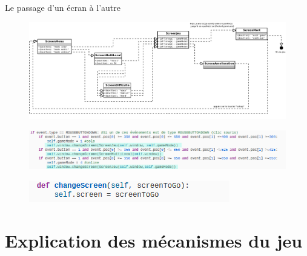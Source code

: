 \documentclass{beamer}
\begin{document}
    
    \begin{frame}{Le passage d'un écran à l'autre}
        \begin{figure}
            \centering
             \includegraphics[scale=0.15]{images/diagrammeEvenementiel.png}
        \end{figure}
        
        \begin{figure}
            \centering
             \includegraphics[scale=0.45]{images/changementEcran.png}
        \end{figure}
        
         \begin{figure}
            \centering
            \includegraphics[scale=0.5]{images/fonctChangScreen.png}
        \end{figure}
    \end{frame}

\section{Explication des mécanismes du jeu}
	
\end{document}
